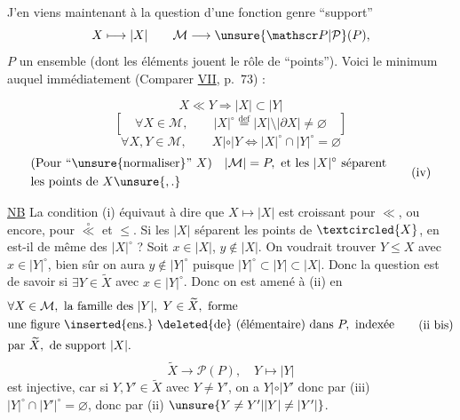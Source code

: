 
J'en viens maintenant à la question d'une fonction genre ``support''
\[
X\longmapsto |X|\qquad \mathcal M\longrightarrow\unsure{\mathscr P|\mathcal P}(P),
\]
$P$  un ensemble (dont les éléments jouent le rôle de ``points''). Voici le minimum auquel  immédiatement (Comparer  \uline{VII}, p.~73) :

\[
X\ll Y\Longrightarrow |X|\subset |Y|\tag*{(i)}
\]
\[
\left[\quad \forall X\in\mathcal M,\qquad |X|^{\circ}\overset{\mathrm{def}}{=}|X|\setminus|\partial X|\ne\varnothing\quad\right]\tag*{(ii)}
\]
\[
\forall X,Y\in\mathcal M,\qquad X\mathrel{|\circ|}Y\Longleftrightarrow |X|^{\circ}\cap |Y|^{\circ}=\varnothing\tag*{(iii)}
\]
\[
\begin{aligned}
&\text{(Pour ``\unsure{normaliser}'' }X\text{)}\quad |\mathcal M|=P,\text{ et les }|X|^{\circ}\text{ séparent}\\
&\text{les points de }X\unsure{,.}
\end{aligned}\tag*{(iv)}
\]

\uline{NB} La condition (i) équivaut à dire que $X\mapsto|X|$ est croissant pour $\ll$, ou encore, pour $\overset{\circ}{\ll}$ et $\leq$. Si les $|X|$ séparent les points de $\textcircled{X}$, en est-il de même des $|X|^{\circ}$ ? Soit $x\in|X|$, $y\notin|X|$. On voudrait trouver $Y\leq X$ avec $x\in|Y|^{\circ}$, bien sûr on aura $y\notin|Y|^{\circ}$ puisque $|Y|^{\circ}\subset|Y|\subset|X|$. Donc la question est de  savoir si $\exists Y\in\widetilde X$ avec $x\in|Y|^{\circ}$. Donc on est amené à  (ii) en
\[
\begin{aligned}
&\forall X\in\mathcal M,\text{ la famille des }|Y|,\ Y\in\widetilde X,\text{ forme}\\
&\text{une figure \inserted{ens.} \deleted{de} (élémentaire) dans }P,\text{ indexée}\\
&\text{par }\widetilde X,\text{ de support }|X|.
\end{aligned}\tag*{(ii bis)}
\]
 
\[
\widetilde X\longrightarrow\mathscr P(P),\quad Y\longmapsto|Y|
\]
est injective, car si $Y,Y'\in\widetilde X$ avec $Y\ne Y'$, on a $Y\mathrel{|\circ|}Y'$ donc par (iii) $|Y|^{\circ}\cap|Y'|^{\circ}=\varnothing$, donc par (ii) $\unsure{Y\ne Y'|\lvert Y\rvert\ne\lvert Y'\rvert}$.

